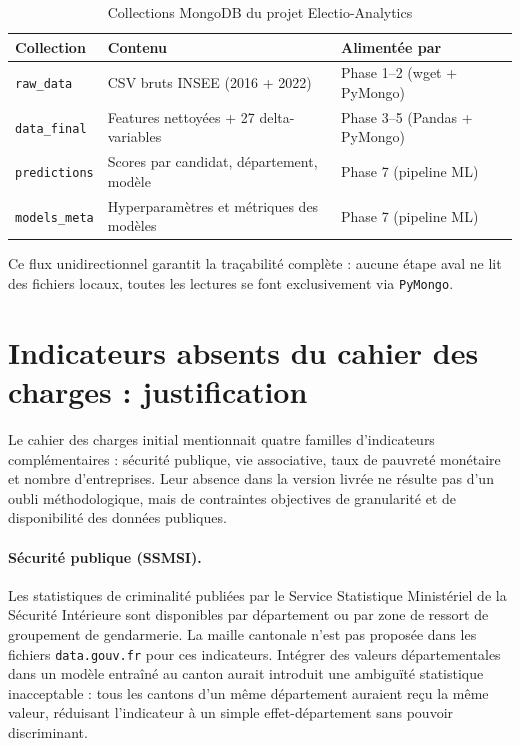 \begin{table}[H]
\centering
\caption{Collections MongoDB du projet Electio-Analytics}
\label{tab:mongo_collections}
\begin{tabular}{lll}
\toprule
\textbf{Collection} & \textbf{Contenu} & \textbf{Alimentée par} \\
\midrule
\texttt{raw\_data}    & CSV bruts INSEE (2016 + 2022)          & Phase 1--2 (wget + PyMongo) \\
\texttt{data\_final}  & Features nettoyées + 27 delta-variables & Phase 3--5 (Pandas + PyMongo) \\
\texttt{predictions}  & Scores par candidat, département, modèle & Phase 7 (pipeline ML) \\
\texttt{models\_meta} & Hyperparamètres et métriques des modèles & Phase 7 (pipeline ML) \\
\bottomrule
\end{tabular}
\end{table}

\noindent Ce flux unidirectionnel garantit la traçabilité complète :
aucune étape aval ne lit des fichiers locaux, toutes les lectures se font
exclusivement via \texttt{PyMongo}.

\section{Indicateurs absents du cahier des charges : justification}
\label{sec:indicateurs_absents}

Le cahier des charges initial mentionnait quatre familles d'indicateurs
complémentaires : sécurité publique, vie associative, taux de pauvreté monétaire
et nombre d'entreprises. Leur absence dans la version livrée ne résulte pas d'un
oubli méthodologique, mais de contraintes objectives de granularité et de
disponibilité des données publiques.

\paragraph{Sécurité publique (SSMSI).}
Les statistiques de criminalité publiées par le Service Statistique Ministériel de
la Sécurité Intérieure sont disponibles par département ou par zone de ressort de
groupement de gendarmerie. La maille cantonale n'est pas proposée dans les fichiers
\texttt{data.gouv.fr} pour ces indicateurs. Intégrer des valeurs départementales
dans un modèle entraîné au canton aurait introduit une ambiguïté statistique
inacceptable : tous les cantons d'un même département auraient reçu la même valeur,
réduisant l'indicateur à un simple effet-département sans pouvoir discriminant.

